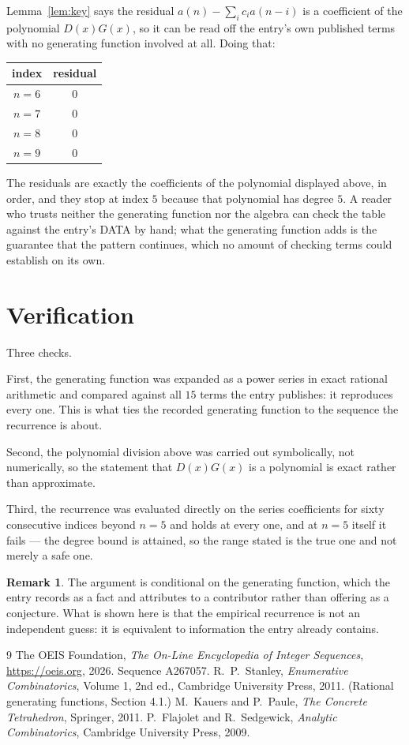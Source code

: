 \documentclass[11pt,a4paper]{article}
\theoremstyle{plain}
\theoremstyle{definition}
\newtheorem{remark}[theorem]{Remark}
\begin{document}
Lemma~\ref{lem:key} says the residual $a(n)-\sum_ic_ia(n-i)$ is a coefficient of the
polynomial $D(x)G(x)$, so it can be read off the entry's own published terms with no
generating function involved at all. Doing that:
\begin{center}
\begin{tabular}{cc}
index & residual \\ \hline
$n=6$ & $0$ \\
$n=7$ & $0$ \\
$n=8$ & $0$ \\
$n=9$ & $0$
\end{tabular}
\end{center}
The residuals are exactly the coefficients of the polynomial displayed above, in order, and
they stop at index $5$ because that polynomial has degree $5$. A reader who trusts
neither the generating function nor the algebra can check the table against the entry's DATA
by hand; what the generating function adds is the guarantee that the pattern continues, which
no amount of checking terms could establish on its own.

\section{Verification}

Three checks.

First, the generating function was expanded as a power series in exact rational arithmetic and
compared against all $15$ terms the entry publishes: it reproduces every one. This is
what ties the recorded generating function to the sequence the recurrence is about.

Second, the polynomial division above was carried out symbolically, not numerically, so the
statement that $D(x)G(x)$ is a polynomial is exact rather than approximate.

Third, the recurrence was evaluated directly on the series coefficients for sixty consecutive
indices beyond $n=5$ and holds at every one, and at $n=5$ itself it fails --- the
degree bound is attained, so the range stated is the true one and not merely a safe one.

\begin{remark}
The argument is conditional on the generating function, which the entry records as a fact and
attributes to a contributor rather than offering as a conjecture. What is shown here is that
the empirical recurrence is not an independent guess: it is equivalent to information the
entry already contains.
\end{remark}

\begin{thebibliography}{9}
 The OEIS Foundation, \emph{The On-Line Encyclopedia of Integer
Sequences}, \url{https://oeis.org}, 2026. Sequence A267057.
 R.~P.~Stanley, \emph{Enumerative Combinatorics}, Volume 1, 2nd ed.,
Cambridge University Press, 2011. (Rational generating functions, Section 4.1.)
 M.~Kauers and P.~Paule, \emph{The Concrete Tetrahedron}, Springer, 2011.
 P.~Flajolet and R.~Sedgewick, \emph{Analytic Combinatorics}, Cambridge
University Press, 2009.
\end{thebibliography}
\end{document}
